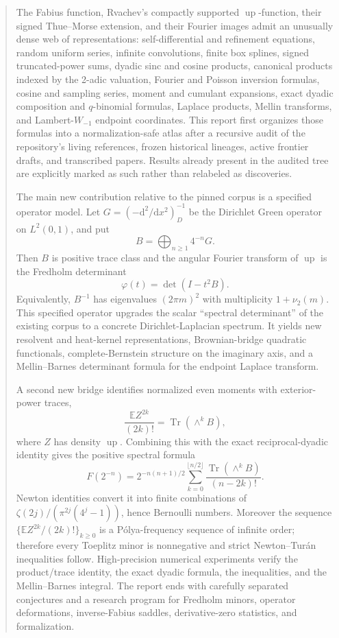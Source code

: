 \documentclass[11pt,oneside]{article}
\theoremstyle{definition}
\newcommand{\E}{\mathbb E}
\newcommand{\Up}{\operatorname{up}}
\newcommand{\Tr}{\operatorname{Tr}}
\newcommand{\vtwo}{\nu_2}
\newcommand{\phiF}{\varphi}
\begin{document}
\begin{abstract}
The Fabius function, Rvachev's compactly supported \(\Up\)-function, their signed
Thue--Morse extension, and their Fourier images admit an unusually dense web of
representations: self-differential and refinement equations, random uniform series,
infinite convolutions, finite box splines, signed truncated-power sums, dyadic sinc and
cosine products, canonical products indexed by the 2-adic valuation, Fourier and
Poisson inversion formulas, cosine and sampling series, moment and cumulant
expansions, exact dyadic composition and \(q\)-binomial formulas, Laplace products,
Mellin transforms, and Lambert-\(W_{-1}\) endpoint coordinates.  This report first
organizes those formulas into a normalization-safe atlas after a recursive audit of the
repository's living references, frozen historical lineages, active frontier drafts, and
transcribed papers.  Results already present in the audited tree are explicitly marked
as such rather than relabeled as discoveries.

The main new contribution relative to the pinned corpus is a specified operator model.
Let \(G=(-\mathrm d^2/\mathrm dx^2)_D^{-1}\) be the Dirichlet Green operator on
\(L^2(0,1)\), and put
\[
 B=\bigoplus_{n\ge1}4^{-n}G.
\]
Then \(B\) is positive trace class and the angular Fourier transform of \(\Up\) is the
Fredholm determinant
\[
 \phiF(t)=\det(I-t^2B).
\]
Equivalently, \(B^{-1}\) has eigenvalues \((2\pi m)^2\) with multiplicity
\(1+\vtwo(m)\).  This specified operator upgrades the scalar ``spectral determinant''
of the existing corpus to a concrete Dirichlet-Laplacian spectrum.  It yields new
resolvent and heat-kernel representations, Brownian-bridge quadratic functionals,
complete-Bernstein structure on the imaginary axis, and a Mellin--Barnes determinant
formula for the endpoint Laplace transform.

A second new bridge identifies normalized even moments with exterior-power traces,
\[
 \frac{\E Z^{2k}}{(2k)!}=\Tr(\wedge^kB),
\]
where \(Z\) has density \(\Up\).  Combining this with the exact reciprocal-dyadic
identity gives the positive spectral formula
\[
 F(2^{-n})=2^{-n(n+1)/2}
 \sum_{k=0}^{\lfloor n/2\rfloor}
 \frac{\Tr(\wedge^kB)}{(n-2k)!}.
\]
Newton identities convert it into finite combinations of
\(\zeta(2j)/(\pi^{2j}(4^j-1))\), hence Bernoulli numbers.  Moreover the sequence
\(\{\E Z^{2k}/(2k)!\}_{k\ge0}\) is a P\'olya-frequency sequence of infinite order;
therefore every Toeplitz minor is nonnegative and strict Newton--Tur\'an inequalities
follow.  High-precision numerical experiments verify the product/trace identity, the
exact dyadic formula, the inequalities, and the Mellin--Barnes integral.  The report
ends with carefully separated conjectures and a research program for Fredholm minors,
operator deformations, inverse-Fabius saddles, derivative-zero statistics, and
formalization.
\end{abstract}
\end{document}

